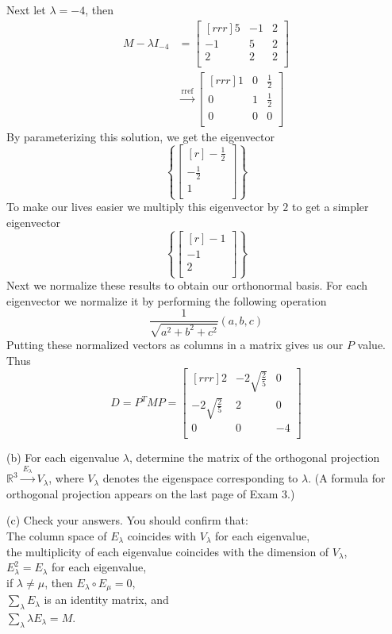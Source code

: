 \documentclass[12pt]{article}
\theoremstyle{definition}
\theoremstyle{plain}
\begin{document}
Next let $\lambda=-4$, then
\begin{align*}
M - \lambda I_{-4} &= \begin{bmatrix}[rrr]5&-1&2\\-1&5&2\\2&2&2\\\end{bmatrix}\\
&\xrightarrow[]{\mathrm{rref}} \begin{bmatrix}[rrr]1&0&\frac{1}{2}\\0&1&\frac{1}{2}\\0&0&0\\\end{bmatrix}
\end{align*}
By parameterizing this solution, we get the eigenvector
\[ \left\{\begin{bmatrix}[r]-\frac{1}{2}\\-\frac{1}{2}\\1\\\end{bmatrix}\right\} \]
To make our lives easier we multiply this eigenvector by $2$ to get a simpler eigenvector
\[ \left\{\begin{bmatrix}[r]-1\\-1\\2\\\end{bmatrix}\right\} \]
Next we normalize these results to obtain our orthonormal basis. For each eigenvector we normalize it by performing the following operation
\[ \dfrac{1}{\sqrt{a^2+b^2+c^2}}(a,b,c) \]
Putting these normalized vectors as columns in a matrix gives us our $P$ value. Thus
\[ D = P^TMP =\begin{bmatrix}[rrr]2&-2\sqrt{\frac{2}{5}}&0\\-2\sqrt{\frac{2}{5}}&2&0\\0&0&-4\\\end{bmatrix} \]



\newpage
(b) For each eigenvalue $\lambda$, determine the matrix of the orthogonal projection
$\mathbb{R}^3\xrightarrow{\ E_\lambda\ }V_\lambda$, where $V_\lambda$ denotes the eigenspace
corresponding to $\lambda$.  (A formula for orthogonal projection appears on the last page of Exam 3.)

(c) Check your answers.  You should confirm that: \\
The column space of $E_\lambda$ coincides with $V_\lambda$ for each eigenvalue, \\
the multiplicity of each eigenvalue coincides with the dimension of $V_\lambda$, \\
$E_\lambda^2=E_\lambda$ for each eigenvalue, \\
if $\lambda\neq\mu$, then $E_\lambda\circ E_\mu=0$, \\
$\sum_\lambda E_\lambda$ is an identity matrix, and \\
$\sum_\lambda \lambda E_\lambda=M$. \\
\end{document}

